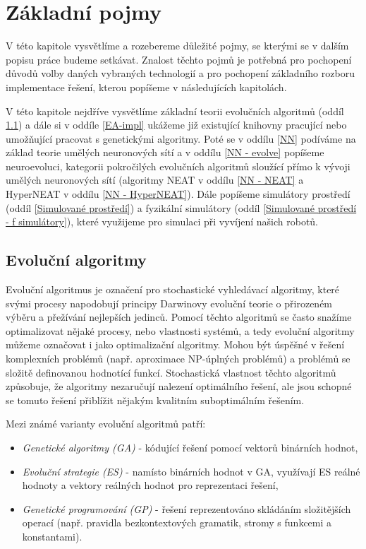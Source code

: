 \chapter{Základní pojmy}

V této kapitole vysvětlíme a rozebereme důležité pojmy, se kterými se v dalším
popisu práce budeme setkávat. Znalost těchto pojmů je potřebná pro pochopení
důvodů volby daných vybraných technologií a pro pochopení základního rozboru
implementace řešení, kterou popíšeme v následujících kapitolách.

V této kapitole nejdříve vysvětlíme základní teorii evolučních algoritmů (oddíl
\ref{Evoluční algoritmy}) a dále si v oddíle \ref{EA-impl} ukážeme již
existující knihovny pracující nebo umožňující pracovat s genetickými algoritmy.
Poté se v oddílu \ref{NN} podíváme na základ teorie umělých neuronových sítí a
v oddílu \ref{NN - evolve} popíšeme neuroevoluci, kategorii pokročilých
evolučních algoritmů sloužící přímo k vývoji umělých neuronových sítí
(algoritmy NEAT v oddílu \ref{NN - NEAT} a HyperNEAT v oddílu \ref{NN -
HyperNEAT}). Dále popíšeme simulátory prostředí (oddíl \ref{Simulované
prostředí}) a fyzikální simulátory (oddíl \ref{Simulované prostředí - f
simulátory}), které využijeme pro simulaci při vyvíjení našich robotů.

\section{Evoluční algoritmy} \label{Evoluční algoritmy}

Evoluční algoritmus je označení pro stochastické vyhledávací algoritmy, které
svými procesy napodobují principy Darwinovy evoluční teorie o přirozeném výběru
a přežívání nejlepších jedinců. Pomocí těchto algoritmů se často snažíme
optimalizovat nějaké procesy, nebo vlastnosti systémů, a tedy evoluční
algoritmy můžeme označovat i jako optimalizační algoritmy. Mohou být úspěšné v
řešení komplexních problémů (např. aproximace NP-úplných problémů) a problémů
se složitě definovanou hodnotící funkcí. Stochastická vlastnost těchto
algoritmů způsobuje, že algoritmy nezaručují nalezení optimálního řešení, ale
jsou schopné se tomuto řešení přiblížit nějakým kvalitním suboptimálním
řešením.

Mezi známé varianty evoluční algoritmů patří:
\begin{itemize}
    \item \emph{Genetické algoritmy (GA)} - kódující řešení pomocí vektorů binárních
        hodnot,
    \item \emph{Evoluční strategie (ES)} - namísto binárních hodnot v GA,
        využívají ES reálné hodnoty a vektory reálných hodnot pro reprezentaci
        řešení, 
    \item \emph{Genetické programování (GP)} - řešení reprezentováno skládáním
        složitějších operací (např. pravidla bezkontextových gramatik, stromy s
        funkcemi a konstantami).
\end{itemize}

